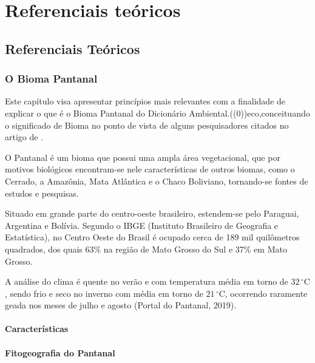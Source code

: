 \part{Referenciais teóricos}

\chapter{Referenciais Teóricos}

\section{O Bioma Pantanal}

	Este capítulo visa apresentar princípios mais relevantes  com a finalidade de explicar o que é o Bioma Pantanal do Dicionário Ambiental.((0))eco,conceituando o significado de Bioma no ponto de vista de alguns pesquisadores citados no artigo de .
	
	O Pantanal é um bioma que possui uma ampla área vegetacional, que por motivos biológicos encontram-se nele características de outros biomas, como o Cerrado, a Amazônia, Mata Atlântica e o Chaco Boliviano, tornando-se fontes de estudos e pesquisas.
	
	Situado em grande parte do centro-oeste brasileiro, estendem-se pelo Paraguai, Argentina e Bolívia. Segundo o IBGE (Instituto Brasileiro de Geografia e Estatística), no Centro Oeste do Brasil é ocupado  cerca  de 189 mil quilômetros quadrados, dos quais 63\% na região de Mato Grosso do Sul e 37\% em Mato Grosso.
	
	A análise do clima é quente no verão e com temperatura média em torno de $32\,^{\circ}\mathrm{C}$, sendo frio e seco no inverno com média em torno de $21\,^{\circ}\mathrm{C}$, ocorrendo raramente geada nos meses de julho e agosto (Portal do Pantanal, 2019).	

	\subsection{Características}
	
		
	
	\subsection{Fitogeografia do Pantanal} 
	
